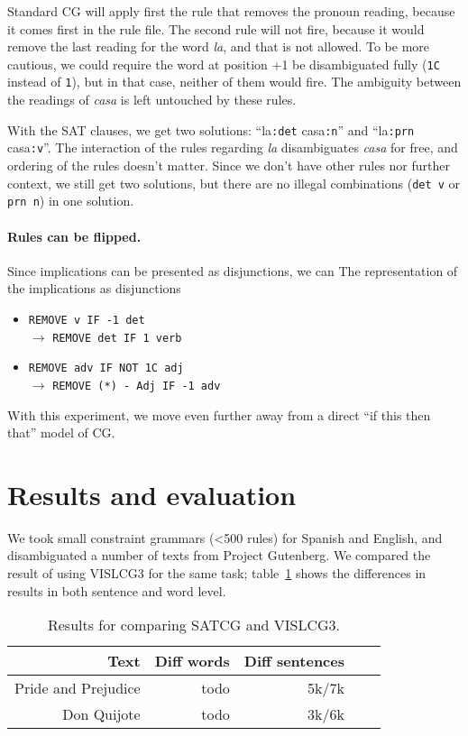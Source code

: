 \documentclass[11pt]{article}
\begin{document}
Standard CG will apply first the rule that removes the pronoun reading, because it comes first in the rule file.
The second rule will not fire, because it would remove the last reading for the word \emph{la}, and that is not allowed. To be more cautious, we could require the word at position +1 be disambiguated fully (\texttt{1C} instead of \texttt{1}), but in that case, neither of them would fire. The ambiguity between the readings of \emph{casa} is left untouched by these rules.

With the SAT clauses, we get two solutions: ``la\texttt{:det} casa\texttt{:n}''  and ``la\texttt{:prn} casa\texttt{:v}''. The interaction of the rules regarding \emph{la}  disambiguates \emph{casa} for free, and ordering of the rules doesn't matter. Since we don't have other rules nor further context, we still get two solutions, but there are no illegal combinations (\texttt{det v} or \texttt{prn n}) in one solution.

\paragraph{Rules can be flipped.}
Since implications can be presented as disjunctions, we can 
The representation of the implications as disjunctions 
\begin{itemize}
\item [] \texttt{REMOVE v IF -1 det} \\ $\rightarrow$ \texttt{REMOVE det IF 1 verb}   
\item [] \texttt{REMOVE adv IF NOT 1C adj} \\ $\rightarrow$ \texttt{REMOVE (*) - Adj  IF -1 adv}  \\
\end{itemize}

With this experiment, we move even further away from a direct ``if this then that'' model of CG.

\section{Results and evaluation}

We took small constraint grammars (\textless{}500 rules) for Spanish and English, and disambiguated a number of texts from Project Gutenberg. We compared the result of using VISLCG3 for the same task; table~\ref{table:results} shows the differences in results in both sentence and word level.

\begin{table}
  \centering
  \begin{tabular}{|r|r|r|r|r|}
     \hline
    \textbf{Text} & \textbf{Diff words} & \textbf{Diff sentences} \\
    \hline
	Pride and Prejudice & todo & 5k/7k \\  
    \hline
       Don Quijote & todo & 3k/6k  \\ 
     \hline
  \end{tabular}
  \caption{Results for comparing SATCG and VISLCG3.}
  \label{table:results}
\end{table}
\end{document}
